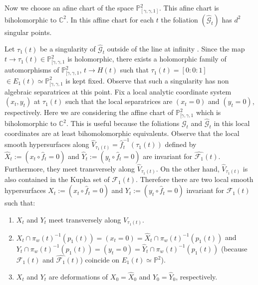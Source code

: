 \documentclass{amsart}
\theoremstyle{definition}
\theoremstyle{proposition}
\numberwithin{equation}{section}
\theoremstyle{main}
\begin{document}
 Now we choose an afine chart of the space $\mathbb P_{[\gamma,\gamma,1]}^2$. This afine chart is biholomorphic to $\mathbb C^2$. In this affine chart for each $t$ the foliation $(\hat{\mathcal {G}}_{t})$ has $d^2$ singular points.
 
Let ${\tau}_{1}(t)$ be a singularity of $\hat{\mathcal G}_{t}$ outside of the line at infinity . Since the map $t \to {\tau}_{1}(t) \in \mathbb P_{[\gamma,\gamma,1}^2$ is holomorphic, there exists a holomorphic family of automorphisms of $\mathbb P_{[\gamma,\gamma,1}^2$, $t \to H(t)$ such that  ${\tau}_{1}(t)=[0:0:1]$ $\in {{E_{1}(t)}\simeq \mathbb P_{[\gamma,\gamma,1}^2}$  is kept fixed.  Observe that such a singularity has non algebraic separatrices at this point. Fix a local analytic coordinate system $(x_t,y_t)$ at 
${\tau}_{1}(t)$ such that the local separatrices are $(x_t=0)$ and $(y_t=0)$, respectively. Here we are considering the affine chart of $\mathbb P_{[\gamma,\gamma,1}^2$ which is biholomorphic to $\mathbb C^2$. This is useful because the foliations ${\mathcal G}_{t}$ and $\hat{\mathcal G}_{t}$ in this local coordinates are at least bihomolomorphic equivalents. Observe that the local smooth hypersurfaces along $\hat V_{\tau_1(t)}=\hat{f}_{t}^{-1}({\tau}_{1}(t))$ defined by $\hat X_t:=(x_t\circ\hat{f}_{t}=0)$ and 
$\hat Y_t:=(y_t\circ\hat{f}_{t}=0)$ are invariant for $\hat{\mathcal{F}_{1}}({t})$. Furthermore, they meet transversely along  $\hat V_{\tau_1(t)}$. On the other hand, $\hat V_{\tau_1(t)}$ is also contained in the Kupka set of ${\mathcal{F}_{1}}({t})$.  Therefore there are two local smooth hypersurfaces $X_t:=(x_t\circ\hat{f}_{t}=0)$ and 
$Y_t:=(y_t\circ\hat{f}_{t}=0)$ invariant for ${\mathcal{F}_{1}}({t})$ such that:
\begin{enumerate}
\item $X_t$ and $Y_t$ meet transversely along $\hat V_{\tau_1(t)}$.
\item$X_t\cap\pi_{w}(t)^{-1}(p_{1}(t))=(x_t=0)=\hat X_t\cap\pi_{w}(t)^{-1}(p_{1}(t))$ and $Y_t\cap\pi_{w}(t)^{-1}(p_{1}(t))=(y_t=0)=\hat Y_t\cap\pi_{w}(t)^{-1}(p_{1}(t))$ (because ${\mathcal{F}_{1}}({t})$ and $\hat{\mathcal{F}_{1}}({t})$) coincide on ${{E_{1}(t)}\simeq \mathbb P^2}$).
\item $X_t$ and $Y_t$ are deformations of $X_0=\hat X_0$ and $Y_0=\hat Y_0$, respectively. 
\end{enumerate}
\end{document}
